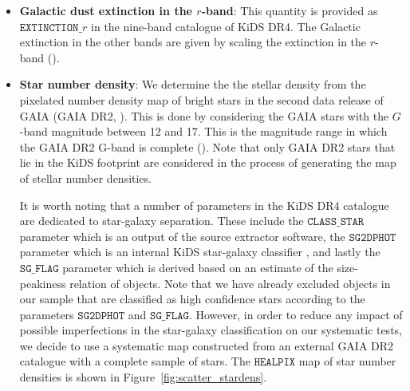\documentclass{aa}
\numberwithin{equation}{section}
\begin{document}
\begin{itemize}
  \item \textbf{Galactic dust extinction in the $r$-band}: This quantity is provided as $\mathtt{EXTINCTION}\_r$ in the nine-band catalogue of KiDS DR4. The Galactic extinction in the other bands are given by scaling the extinction in the $r$-band (\citealt{schlegel98, schlafly2011}).
  
  \item \textbf{Star number density}: We determine the the stellar density from the pixelated number density map of bright stars in the second data release of GAIA (GAIA DR2, \citet{gaia0}). This is done by considering the GAIA stars with the $G$-band magnitude between 12 and 17. This is the magnitude range in which the GAIA DR2 G-band is complete (\citealt{gaia0,gaia1}). Note that only GAIA DR2 stars that lie in the KiDS footprint are considered in the process of generating the map of stellar number densities. 
  
  It is worth noting that a number of parameters in the KiDS DR4 catalogue are dedicated to star-galaxy separation. These include the $\mathtt{CLASS\_STAR}$
  parameter which is an output of the source extractor software, the $\mathtt{SG2DPHOT}$ parameter which is an internal KiDS star-galaxy classifier \citep[e.g.][]{kids_dr3, radovich2017}, and lastly the $\mathtt{SG\_FLAG}$ parameter which is derived based on an estimate of the size-peakiness relation of objects. Note that we have already excluded objects in our sample that are classified as high confidence stars according to the parameters $\mathtt{SG2DPHOT}$ and $\mathtt{SG\_FLAG}$. However, in order to reduce any impact of possible imperfections in the star-galaxy classification on our systematic tests, we decide to use a systematic map constructed from an external GAIA DR2 catalogue with a complete sample of stars. The $\mathtt{HEALPIX}$ map of star number densities is shown in Figure~\ref{fig:scatter_stardens}.
 
\end{itemize}

\end{document}
